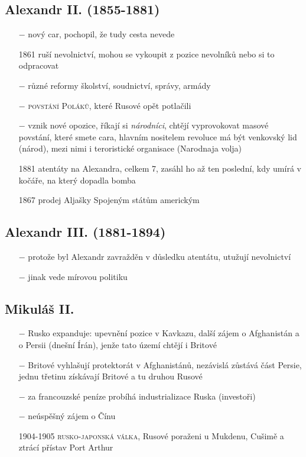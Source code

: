 \documentclass{article}
\begin{document}
\subsection*{Alexandr II. (1855-1881)}
\begin{itemize}
    \vspace{-0.5em}
    \setlength\itemsep{0.15em}
    \item[$-$] nový car, pochopil, že tudy cesta nevede
    \item[1861] ruší nevolnictví, mohou se vykoupit z pozice nevolníků nebo si to odpracovat
    \item[$-$] různé reformy školství, soudnictví, správy, armády
    \item[$-$] \textsc{povstání Poláků}, které Rusové opět potlačili
    \item[$-$] vznik nové opozice, říkají si \textit{národníci}, chtějí vyprovokovat masové povstání, které smete cara, hlavním nositelem revoluce má být venkovský lid (národ), mezi nimi i teroristické organisace (Narodnaja volja)
    \item[1881] atentáty na Alexandra, celkem 7, zasáhl ho až ten poslední, kdy umírá v kočáře, na který dopadla bomba
    \item[1867] prodej Aljašky Spojeným státům americkým
\end{itemize}

\subsection*{Alexandr III. (1881-1894)}
\begin{itemize}
    \vspace{-0.5em}
    \setlength\itemsep{0.15em}
    \item[$-$] protože byl Alexandr zavražděn v důsledku atentátu, utužují nevolnictví
    \item[$-$] jinak vede mírovou politiku
\end{itemize}

\subsection*{Mikuláš II. }
\begin{itemize}
    \vspace{-0.5em}
    \setlength\itemsep{0.15em}
    \item[$-$] Rusko expanduje: upevnění pozice v Kavkazu, další zájem o Afghanistán a o Persii (dnešní Írán), jenže tato území chtějí i Britové
    \item[$-$] Britové vyhlašují protektorát v Afghanistánů, nezávislá zůstává část Persie, jednu třetinu získávají Britové a tu druhou Rusové
    \item[$-$] za francouzské peníze probíhá industrializace Ruska (investoři)
    \item[$-$] neúspěšný zájem o Čínu
    \item[1904-1905] \textsc{rusko-japonská válka}, Rusové poraženi u Mukdenu, Cušimě a ztrácí přístav Port Arthur
\end{itemize}
\end{document}
